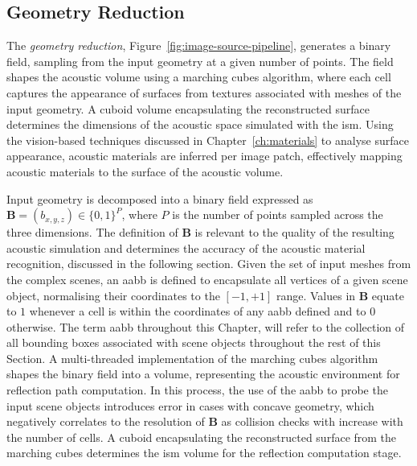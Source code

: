\subsection{Geometry Reduction}
The \emph{geometry reduction}, Figure~\ref{fig:image-source-pipeline}, generates a binary field, sampling from the input geometry at a given number of points. The field shapes the acoustic volume using a marching cubes algorithm, where each cell captures the appearance of surfaces from textures associated with meshes of the input geometry. A cuboid volume encapsulating the reconstructed surface determines the dimensions of the acoustic space simulated with the \acrshort{ism}. Using the vision-based techniques discussed in Chapter~\ref{ch:materials} to analyse surface appearance, acoustic materials are inferred per image patch, effectively mapping acoustic materials to the surface of the acoustic volume.\par
Input geometry is decomposed into a binary field expressed as $\mathbf{B} = (b_{x,y,z}) \in \{ 0, 1 \}^{P}$, where $P$ is the number of points sampled across the three dimensions. The definition of $\mathbf{B}$ is relevant to the quality of the resulting acoustic simulation and determines the accuracy of the acoustic material recognition, discussed in the following section. Given the set of input meshes from the complex scenes, an \acrfull{aabb} is defined to encapsulate all vertices of a given scene object, normalising their coordinates to the $[-1, +1]$ range. Values in $\mathbf{B}$ equate to $1$ whenever a cell is within the coordinates of any \acrshort{aabb} defined and to $0$ otherwise. The term \acrshort{aabb} throughout this Chapter, will refer to the collection of all bounding boxes associated with scene objects throughout the rest of this Section. A multi-threaded implementation of the marching cubes algorithm \citep{bourke1994polygonising, lengyel2019foundations} shapes the binary field into a volume, representing the acoustic environment for reflection path computation. In this process, the use of the \acrshort{aabb} to probe the input scene objects introduces error in cases with concave geometry, which negatively correlates to the resolution of $\mathbf{B}$ as collision checks with  increase with the number of cells. A cuboid encapsulating the reconstructed surface from the marching cubes determines the \acrshort{ism} volume for the reflection computation stage.\par

